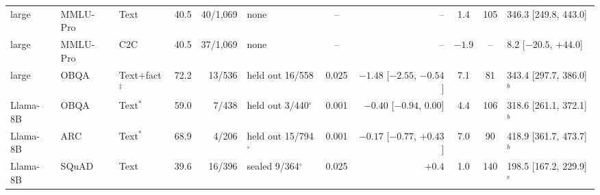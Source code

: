 \begin{table}[t]
{\begin{tabular}{lllcrlcrccl}
large & MMLU-Pro & Text & 40.5 & 40/1,069 & none & -- & -- & 1.4 & 105 & 346.3 [249.8, 443.0]\\
large & MMLU-Pro & C2C & 40.5 & 37/1,069 & none & -- & -- & $-1.9$ & -- & 8.2 [$-20.5$, $+44.0$]\\
large & OBQA & Text+fact$^\ddagger$ & 72.2 & 13/536 & held out 16/558 & 0.025 & $-1.48$ [$-2.55$, $-0.54$] & 7.1 & 81 & 343.4 [297.7, 386.0]$^{b}$\\\midrule
Llama-8B & OBQA & Text$^{*}$ & 59.0 & 7/438 & held out 3/440$^{\circ}$ & 0.001 & $-0.40$ [$-0.94$, 0.00] & 4.4 & 106 & 318.6 [261.1, 372.1]$^{b}$\\
Llama-8B & ARC & Text$^{*}$ & 68.9 & 4/206 & held out 15/794$^{\circ}$ & 0.001 & $-0.17$ [$-0.77$, $+0.43$] & 7.0 & 90 & 418.9 [361.7, 473.7]$^{b}$\\
Llama-8B & SQuAD & Text & 39.6 & 16/396 & sealed 9/364$^{\circ}$ & 0.025 & $+0.4$ & 1.0 & 140 & 198.5 [167.2, 229.9]$^{e}$\\\bottomrule
\end{tabular}}
\end{table}
